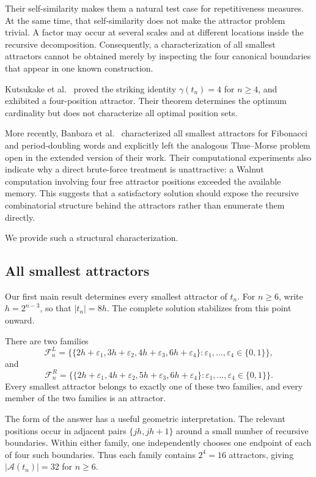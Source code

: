 \documentclass[11pt,a4paper]{article}
\theoremstyle{definition}\newtheorem{definition}[theorem]{Definition}
\theoremstyle{remark}\newtheorem{remark}[theorem]{Remark}
\newcommand{\Acal}{\mathcal{A}}
\newcommand{\FL}{\mathcal{F}^{L}}
\newcommand{\FR}{\mathcal{F}^{R}}
\begin{document}
Their self-similarity makes them a natural test case for repetitiveness measures. At the same time, that self-similarity does not make the attractor problem trivial. A factor may occur at several scales and at different locations inside the recursive decomposition. Consequently, a characterization of all smallest attractors cannot be obtained merely by inspecting the four canonical boundaries that appear in one known construction.

Kutsukake et al.~\cite{Kutsukake2020} proved the striking identity
$
\gamma(t_n)=4$
for $n\geq4$,
and exhibited a four-position attractor. Their theorem determines the optimum cardinality but does not characterize all optimal position sets.

More recently, Banbara et al.~\cite{Banbara2026} characterized all smallest attractors for Fibonacci and period-doubling words and explicitly left the analogous Thue--Morse problem open in the extended version of their work. Their computational experiments also indicate why a direct brute-force treatment is unattractive: a Walnut computation involving four free attractor positions exceeded the available memory. This suggests that a satisfactory solution should expose the recursive combinatorial structure behind the attractors rather than enumerate them directly.

We provide such a structural characterization.

\subsection{All smallest attractors}
Our first main result determines every smallest attractor of $t_n$. For $n\geq6$, write $h=2^{n-3}$, so that $|t_n|=8h$. The complete solution stabilizes from this point onward.

There are two families
\[
\FL_n=\bigl\{\{2h+\varepsilon_1,3h+\varepsilon_2,4h+\varepsilon_3,6h+\varepsilon_4\}:\varepsilon_1,\ldots,\varepsilon_4\in\{0,1\}\bigr\},
\]
and
\[
\FR_n=\bigl\{\{2h+\varepsilon_1,4h+\varepsilon_2,5h+\varepsilon_3,6h+\varepsilon_4\}:\varepsilon_1,\ldots,\varepsilon_4\in\{0,1\}\bigr\}.
\]
Every smallest attractor belongs to exactly one of these two families, and every member of the two families is an attractor.

The form of the answer has a useful geometric interpretation. The relevant positions occur in adjacent pairs $\{jh,jh+1\}$ around a small number of recursive boundaries. Within either family, one independently chooses one endpoint of each of four such boundaries. Thus each family contains $2^4=16$ attractors, giving $|\Acal(t_n)|=32$ for $n\geq6$.
\end{document}
